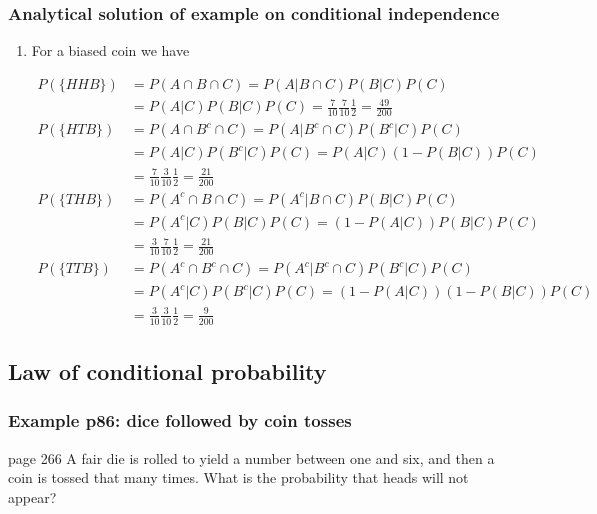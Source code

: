 \begin{frame}
    \frametitle{Analytical solution of example on conditional independence}

    \scriptsize
    \begin{enumerate}[a]

        \conti
        \item
            For a biased coin we have

            \begin{align*}
                P(\{HHB\})&=P(A\cap B\cap C)=P(A|B\cap C)P(B|C)P(C)\\
                          &=P(A|C)P(B|C)P(C)=\frac{7}{10}\frac{7}{10}\frac{1}{2}=\frac{49}{200}\\
                P(\{HTB\})&=P(A\cap B^c\cap C)=P(A|B^c\cap C)P(B^c|C)P(C)\\
                          &=P(A|C)P(B^c|C)P(C)=P(A|C)(1-P(B|C))P(C)\\
                          &=\frac{7}{10}\frac{3}{10}\frac{1}{2}=\frac{21}{200}\\
                P(\{THB\})&=P(A^c\cap B\cap C)=P(A^c|B\cap C)P(B|C)P(C)\\
                          &=P(A^c|C)P(B|C)P(C)=(1-P(A|C))P(B|C)P(C)\\
                          &=\frac{3}{10}\frac{7}{10}\frac{1}{2}=\frac{21}{200}\\
                P(\{TTB\})&=P(A^c\cap B^c\cap C)=P(A^c|B^c\cap C)P(B^c|C)P(C)\\
                          &=P(A^c|C)P(B^c|C)P(C)=(1-P(A|C))(1-P(B|C))P(C)\\
                          &=\frac{3}{10}\frac{3}{10}\frac{1}{2}=\frac{9}{200}
            \end{align*}
    \end{enumerate}
    \normalsize

\end{frame}

\subsection{Law of conditional probability}

\begin{frame}
    \frametitle{Example p86: dice followed by coin tosses}

    \begin{manualProbExample}{page 266}
        A fair die is rolled to yield a number between one and six, and then a
        coin is tossed that many times. What is the probability that heads will
        not appear?
    \end{manualProbExample}

\end{frame}

